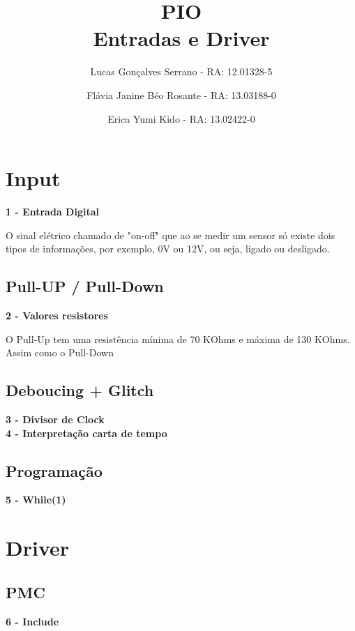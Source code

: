 \documentclass{article}
\begin{document}
	\title{PIO\\
		Entradas e Driver}
\author{Lucas Gonçalves Serrano - RA: 12.01328-5 \and Flávia Janine Béo Rosante - RA: 13.03188-0 \and Erica Yumi Kido - RA: 13.02422-0}
	\maketitle

	\section{Input}
	\textbf{1 - Entrada Digital}
	
	O sinal elétrico chamado de "on-off" que ao se medir um sensor só existe dois tipos de informações, por exemplo, 0V ou 12V, ou seja, ligado ou desligado.
	
	\subsection{Pull-UP / Pull-Down}
	\textbf{2 - Valores resistores} 
	
	O Pull-Up tem uma resistência mínima de 70 KOhms e máxima de 130 KOhms. Assim como o Pull-Down
	
	\subsection{Deboucing + Glitch}
	\textbf{3 - Divisor de Clock}\\
	\textbf{4 - Interpretação carta de tempo}
	
	\subsection{Programação}
	\textbf{5 - While(1)}
	
	\section{Driver}
	\subsection{PMC}
	\textbf{6 - Include}
\end{document}
